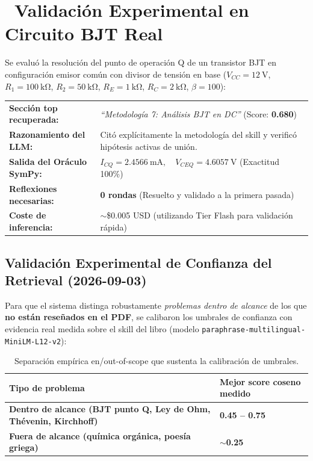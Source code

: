 \documentclass[11pt,a4paper]{article}
\newcommand{\iconotexto}[2]{\textcolor{cyanNeon}{\faIcon{#1}}~#2}
\begin{document}
\section[Validación Experimental Fase 2]{\iconotexto{flask}{Validación Experimental en Circuito BJT Real}}

Se evaluó la resolución del punto de operación Q de un transistor BJT en configuración emisor común con divisor de tensión en base ($V_{CC} = \SI{12}{\volt}$, $R_1 = \SI{100}{\kilo\ohm}$, $R_2 = \SI{50}{\kilo\ohm}$, $R_E = \SI{1}{\kilo\ohm}$, $R_C = \SI{2}{\kilo\ohm}$, $\beta = 100$):

\begin{tcolorbox}[tarjetaDato, title={\faIcon{check-circle}~Resultados de la Ejecución Experimental de Fase 2}]
  \begin{tabularx}{\linewidth}{>{\bfseries\color{azulNoche}}l X}
    Sección top recuperada: & \textit{``Metodología 7: Análisis BJT en DC''} (Score: \textbf{0.680}) \\
    Razonamiento del LLM: & Citó explícitamente la metodología del skill y verificó hipótesis activas de unión. \\
    Salida del Oráculo SymPy: & $I_{CQ} = \SI{2.4566}{\milli\ampere}, \quad V_{CEQ} = \SI{4.6057}{\volt}$ (Exactitud 100\%) \\
    Reflexiones necesarias: & \textbf{0 rondas} (Resuelto y validado a la primera pasada) \\
    Coste de inferencia: & $\sim$\$0.005 USD (utilizando Tier Flash para validación rápida) \\
  \end{tabularx}
\end{tcolorbox}

\subsection{Validación Experimental de Confianza del Retrieval (2026-09-03)}
Para que el sistema distinga robustamente \textit{problemas dentro de alcance} de los que
\textbf{no están reseñados en el PDF}, se calibaron los umbrales de confianza con evidencia
real medida sobre el skill del libro (modelo \texttt{paraphrase-multilingual-MiniLM-L12-v2}):

\begin{table}[h!]
\centering
\small
\begin{tabularx}{\linewidth}{>{\bfseries\color{azulNoche}}l >{\raggedright\arraybackslash}X}
\toprule
\rowcolor{azulNoche!12}\textbf{Tipo de problema} & \textbf{Mejor score coseno medido} \\
\midrule
Dentro de alcance (BJT punto Q, Ley de Ohm, Thévenin, Kirchhoff) & \textbf{0.45 -- 0.75} \\
Fuera de alcance (química orgánica, poesía griega) & \textbf{$\sim$0.25} \\
\bottomrule
\end{tabularx}
\caption{Separación empírica en/out-of-scope que sustenta la calibración de umbrales.}
\end{table}
\end{document}
